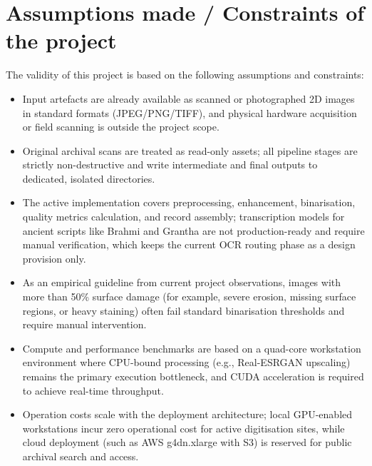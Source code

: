 \section[Assumptions made / Constraints of the project]{Assumptions made / Constraints of the project}
The validity of this project is based on the following assumptions and constraints:
\begin{itemize}
\item Input artefacts are already available as scanned or photographed 2D images in standard formats (JPEG/PNG/TIFF), and physical hardware acquisition or field scanning is outside the project scope.
\item Original archival scans are treated as read-only assets; all pipeline stages are strictly non-destructive and write intermediate and final outputs to dedicated, isolated directories.
\item The active implementation covers preprocessing, enhancement, binarisation, quality metrics calculation, and record assembly; transcription models for ancient scripts like Brahmi and Grantha are not production-ready and require manual verification, which keeps the current OCR routing phase as a design provision only.
\item As an empirical guideline from current project observations, images with more than 50\% surface damage (for example, severe erosion, missing surface regions, or heavy staining) often fail standard binarisation thresholds and require manual intervention.
\item Compute and performance benchmarks are based on a quad-core workstation environment where CPU-bound processing (e.g., Real-ESRGAN upscaling) remains the primary execution bottleneck, and CUDA acceleration is required to achieve real-time throughput.
\item Operation costs scale with the deployment architecture; local GPU-enabled workstations incur zero operational cost for active digitisation sites, while cloud deployment (such as AWS g4dn.xlarge with S3) is reserved for public archival search and access.
\end{itemize}

